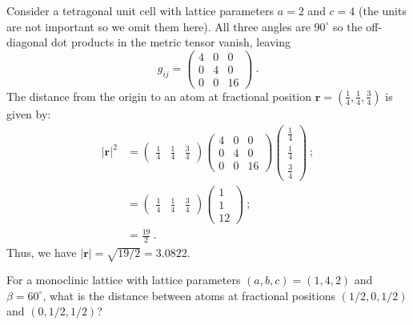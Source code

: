 \begin{example} 
Consider a tetragonal unit cell with lattice parameters $a=2$ and $c=4$ (the units are not important so we omit them here).  All three angles are $90^{\circ}$ so the off-diagonal dot products in the metric tensor vanish, leaving
\[
	g_{ij} = \left(\begin{array}{ccc}
			4 & 0 & 0\\
			0 & 4 & 0\\
			0 & 0 & 16\end{array}\right) \ .
\]
The distance from the origin to an atom at fractional position $\mathbf{r}=(\frac{1}{4},\frac{1}{4},\frac{3}{4})$ is given by:\begin{align*}
	\vert\mathbf{r}\vert^2 &= \left(\begin{array}{ccc}\frac{1}{4} & \frac{1}{4} & \frac{3}{4}\end{array}\right)
			\left(\begin{array}{ccc}
			4 & 0 & 0\\
			0 & 4 & 0\\
			0 & 0 & 16\end{array}\right)
			\left(\begin{array}{c}\frac{1}{4} \\ \frac{1}{4} \\ \frac{3}{4}\end{array}\right)\ ; \\
			&=  \left(\begin{array}{ccc}\frac{1}{4} & \frac{1}{4} & \frac{3}{4}\end{array}\right)
			\left(\begin{array}{c}1 \\ 1 \\ 12\end{array}\right)\ ; \\
			&= \frac{19}{2}\ .
\end{align*}
Thus, we have $\vert\mathbf{r}\vert = \sqrt{19/2} = 3.0822$.
\end{example}

\begin{exercise}
For a monoclinic lattice with lattice parameters $(a,b,c) = (1, 4, 2)$ and $\beta=60^{\circ}$, what is the distance between atoms at fractional positions $(1/2,0,1/2)$ and $(0,1/2,1/2)$?\label{ex:mono}
\end{exercise}

